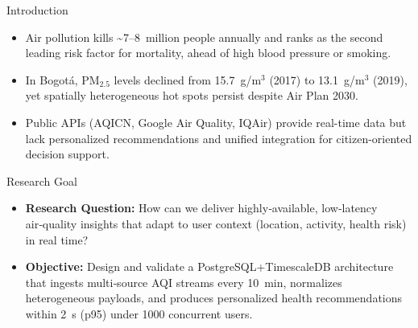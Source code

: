 \documentclass[a0paper,portrait]{baposter}
\newcommand{\alert}[1]{{\color{udblue}#1}}
\begin{document}
\begin{poster}

\begin{posterbox}[name=intro,column=0,row=0]{Introduction}
\begin{itemize}
  \item Air pollution kills \textasciitilde7--8~million people annually and ranks as the \alert{second leading risk factor} for mortality, ahead of high blood pressure or smoking.
  \item In \alert{Bogotá}, PM$_{2.5}$ levels declined from 15.7~\textmu g/m$^3$ (2017) to 13.1~\textmu g/m$^3$ (2019), yet spatially heterogeneous hot spots persist despite Air Plan 2030.
  \item Public APIs (AQICN, Google Air Quality, IQAir) provide real-time data but lack \alert{personalized recommendations} and unified integration for citizen-oriented decision support.
\end{itemize}
\end{posterbox}

\begin{posterbox}[name=goal,column=0,below=intro]{Research Goal}
\begin{itemize}
  \item \textbf{Research Question:} How can we deliver highly‑available, low‑latency air‑quality insights that adapt to user context (location, activity, health risk) in real time?
  \item \textbf{Objective:} Design and validate a PostgreSQL+TimescaleDB architecture that ingests multi‑source AQI streams every 10~min, normalizes heterogeneous payloads, and produces \alert{personalized health recommendations} within 2~s (p95) under 1000 concurrent users.
\end{itemize}
\end{posterbox}


\end{poster}
\end{document}
